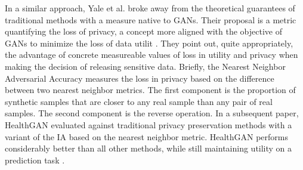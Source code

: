 In a similar approach, Yale et al. broke away from the theoretical guarantees of traditional methods with a measure native to GANs. Their proposal is a metric quantifying the loss of privacy, a concept more aligned with the objective of GANs to minimize the loss of data utilit \cite{yale:hal-02160496,p2019}. They point out, quite appropriately, the advantage of concrete measureable values of loss in utility and privacy when making the decision of releasing sensitive data. Briefly, the Nearest Neighbor Adversarial Accuracy measures the loss in privacy based on the difference between two nearest neighbor metrics. The  first component is the proportion of synthetic samples that are closer to any real sample than any pair of real samples. The second component is the reverse operation. In a subsequent paper, HealthGAN evaluated against traditional privacy preservation methods with a variant of the IA based on the nearest neighbor metric. HealthGAN performs considerably better than all other methods, while still maintaining utility on a prediction task .

